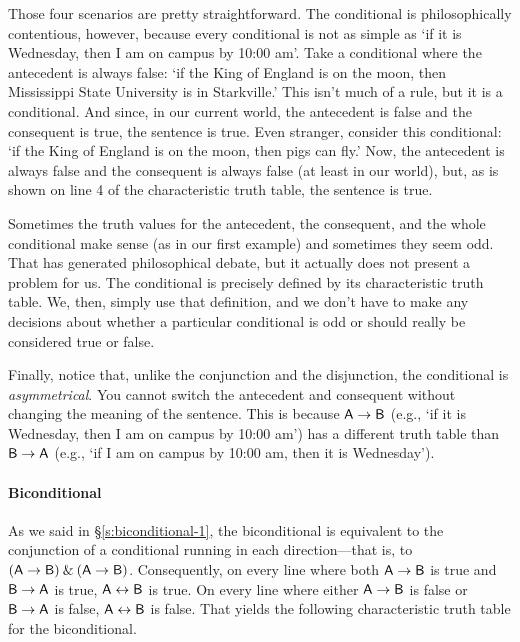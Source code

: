 Those four scenarios are pretty straightforward. The conditional is philosophically contentious, however, because every conditional is not as simple as `if it is Wednesday, then I am on campus by 10:00 am'. Take a conditional where the antecedent is always false: `if the King of England is on the moon, then Mississippi State University is in Starkville.' This isn't much of a rule, but it is a conditional. And since, in our current world, the antecedent is false and the consequent is true, the sentence is true. Even stranger, consider this conditional: `if the King of England is on the moon, then pigs can fly.' Now, the antecedent is always false and the consequent is always false (at least in our world), but, as is shown on line 4 of the characteristic truth table, the sentence is true. 

Sometimes the truth values for the antecedent, the consequent, and the whole conditional make sense (as in our first example) and sometimes they seem odd. That has generated philosophical debate, but it actually does not present a problem for us. The conditional is precisely defined by its characteristic truth table. We, then, simply use that definition, and we don't have to make any decisions about whether a particular conditional is odd or should really be considered true or false. 

Finally, notice that, unlike the conjunction and the disjunction, the conditional is \emph{asymmetrical}. You cannot switch the antecedent and consequent without changing the meaning of the sentence. This is because $\mathsf{A}\rightarrow\mathsf{B}$ (e.g., `if it is Wednesday, then I am on campus by 10:00 am') has a different truth table than $\mathsf{B}\rightarrow\mathsf{A}$ (e.g., `if I am on campus by 10:00 am, then it is Wednesday').


\paragraph{Biconditional}\label{biconditional-2} As we said in \S \ref{s:biconditional-1}, the biconditional is equivalent to the conjunction of a conditional running in each direction---that is, to $(\mathsf{A} \rightarrow \mathsf{B}) \mathbin{\&} (\mathsf{A}\rightarrow\mathsf{B})$. Consequently, on every line where both $\mathsf{A}\rightarrow\mathsf{B}$ is true and $\mathsf{B}\rightarrow\mathsf{A}$ is true, $\mathsf{A}\leftrightarrow\mathsf{B}$ is true. On every line where either $\mathsf{A}\rightarrow\mathsf{B}$ is false or $\mathsf{B}\rightarrow\mathsf{A}$ is false, $\mathsf{A}\leftrightarrow\mathsf{B}$ is false. That yields the following characteristic truth table for the biconditional.

